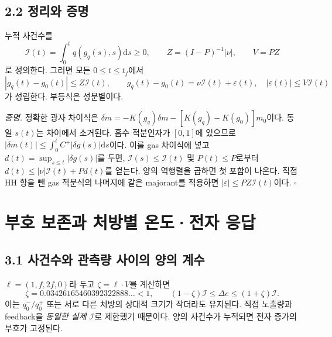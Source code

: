 \documentclass[11pt,a4paper]{article}
\newcommand{\dd}{\mathrm d}\newcommand{\HH}{\mathrm{HH}}\newcommand{\eV}{\mathrm{eV}}
\newcommand{\Ical}{\mathcal I}\newcommand{\titleblock}[2]{\vspace*{2mm}{\large\sffamily\color{ink}#1}\par\vspace{2mm}{\LARGE\bfseries #2}\par\vspace{3mm}}
\begin{document}
\subsection*{2.2 정리와 증명}
누적 사건수를
\begin{equation}
 \Ical(t)=\int_0^tq(g_q(s),s)\dd s\ge0,
 \qquad Z=(I-P)^{-1}|\nu|,\qquad V=PZ
\end{equation}
로 정의한다. 그러면 모든 $0\le t\le t_f$에서
\begin{equation}\boxed{
 |g_q(t)-g_0(t)|\le Z\Ical(t),\qquad
 g_q(t)-g_0(t)=\nu\Ical(t)+\varepsilon(t),\quad
 |\varepsilon(t)|\le V\Ical(t)
}\end{equation}
가 성립한다. 부등식은 성분별이다.

\emph{증명.} 정확한 광자 차이식은
$\dot{\delta m}=-K(g_q)\delta m-[K(g_q)-K(g_0)]m_0$이다. 동일 $s(t)$는 차이에서 소거된다. 흡수 적분인자가 $[0,1]$에 있으므로
$|\delta m(t)|\le\int_0^tC^+|\delta g(s)|\dd s$이다. 이를 gas 차이식에 넣고
$d(t)=\sup_{s\le t}|\delta g(s)|$를 두면, $\Ical(s)\le\Ical(t)$ 및 $P(t)\le P$로부터
$d(t)\le|\nu|\Ical(t)+Pd(t)$를 얻는다. 양의 역행렬을 곱하면 첫 포함이 나온다. 직접 HH 항을 뺀 gas 적분식의 나머지에 같은 majorant를 적용하면 $|\varepsilon|\le PZ\Ical(t)$이다. \hfill$\square$

\newpage
\section{부호 보존과 처방별 온도·전자 응답}
\subsection*{3.1 사건수와 관측량 사이의 양의 계수}
$\ell=(1,f,2f,0)$라 두고 $\zeta=\ell\cdot V$를 계산하면
\begin{equation}
 \zeta=0.03426165460392322888\ldots<1,
 \qquad
 \boxed{(1-\zeta)\Ical\le\Delta e\le(1+\zeta)\Ical}.
\end{equation}
이는 $q_0^-/q_0^+$ 또는 서로 다른 처방의 상대적 크기가 작더라도 유지된다. 직접 노출량과 feedback을 \emph{동일한 실제 $\Ical$}로 제한했기 때문이다. 양의 사건수가 누적되면 전자 증가의 부호가 고정된다.
\end{document}
